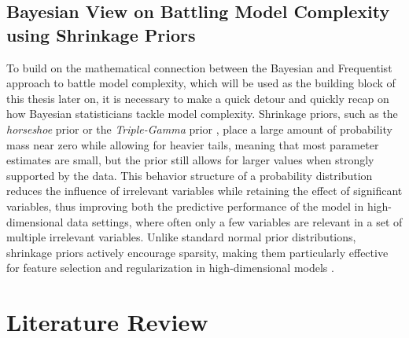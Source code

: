 \documentclass[12pt,a4paper]{article}
\begin{document}
\subsection{Bayesian View on Battling Model Complexity using Shrinkage Priors}\label{sec:BayesianShrinkagePriors}
To build on the mathematical connection between the Bayesian and Frequentist approach to battle model complexity, which will be used as the building block of this thesis later on, it is necessary to make a quick detour and quickly recap on how Bayesian statisticians tackle model complexity.  Shrinkage priors, such as the \textit{horseshoe} prior \parencite{Carvalho2010} or the \textit{Triple-Gamma} prior \parencite{TGP2020}, place a large amount of probability mass near zero while allowing for heavier tails, meaning that most parameter estimates are small, but the prior still allows for larger values when strongly supported by the data. This behavior structure of a probability distribution reduces the influence of irrelevant variables while retaining the effect of significant variables, thus improving both the predictive performance of the model in high-dimensional data settings, where often only a few variables are relevant in a set of multiple irrelevant variables. Unlike standard normal prior distributions, shrinkage priors actively encourage sparsity, making them particularly effective for feature selection and regularization in high-dimensional models \parencite{PiironenVehtari2017}.
\newpage

\section{Literature Review}\label{sec:litreview}
\end{document}

